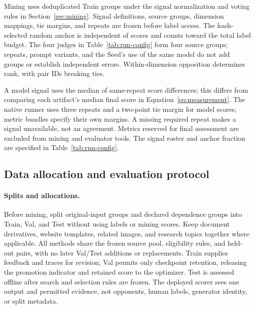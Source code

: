 Mining uses deduplicated Train groups under the signal normalization and voting rules in Section~\ref{sec:mining}.
Signal definitions, source groups, dimension mappings, tie margins, and repeats are frozen before label access.
The hash-selected random anchor is independent of scores and counts toward the total label budget.
The four judges in Table~\ref{tab:run-config} form four source groups; repeats, prompt variants, and the Seed's use of the same model do not add groups or establish independent errors.
Within-dimension opposition determines rank, with pair IDs breaking ties.

A model signal uses the median of same-repeat score differences; this differs from comparing each artifact's median final score in Equation~\ref{eq:measurement}.
The native runner uses three repeats and a two-point tie margin for model scores; metric bundles specify their own margins.
A missing required repeat makes a signal unavailable, not an agreement.
Metrics reserved for final assessment are excluded from mining and evaluator tools.
The signal roster and anchor fraction are specified in Table~\ref{tab:run-config}.

\subsection{Data allocation and evaluation protocol}
\label{app:boundaries}
\label{app:measurement}
\label{app:configuration}

\paragraph{Splits and allocations.}
Before mining, split original-input groups and declared dependence groups into Train, Val, and Test without using labels or mining scores.
Keep document derivatives, website templates, related images, and research topics together where applicable.
All methods share the frozen source pool, eligibility rules, and held-out pairs, with no later Val/Test additions or replacements.
Train supplies feedback and traces for revision; Val permits only checkpoint retention, releasing the promotion indicator and retained score to the optimizer.
Test is assessed offline after search and selection rules are frozen.
The deployed scorer sees one output and permitted evidence, not opponents, human labels, generator identity, or split metadata.

